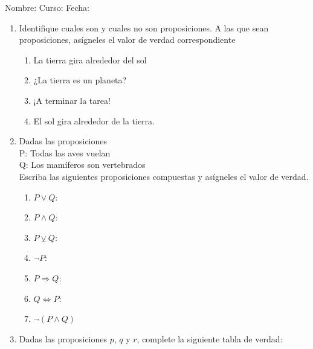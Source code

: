 \documentclass[letterpaper,fleqn]{article}
\newcommand{\LineaNombre}{%
\par
\vspace{\baselineskip}
Nombre:\hrulefill \; Curso: \underline{\hspace*{48pt}} \; Fecha: \underline{\hspace*{2.5cm}} \relax
\par}
\begin{document}
\LineaNombre
\begin{enumerate}
 \item Identifique cuales son y cuales no son proposiciones. A las que sean proposiciones, as\'{i}gneles el valor de verdad correspondiente
 \begin{enumerate}
 \item La tierra gira alrededor del sol
 \item ¿La tierra es un planeta?
 \item ¡A terminar la tarea!
 \item El sol gira alrededor de la tierra.
 \end{enumerate}
 \item Dadas las proposiciones\\
 P: Todas las aves vuelan\\
 Q: Los mamíferos son vertebrados\\
Escriba las siguientes proposiciones compuestas y asígneles el valor de verdad.
\begin{enumerate}
\item $P\vee Q$:
\item $P\wedge Q$:
\item $P \veebar Q$:
\item $\neg P$:
\item $P\Rightarrow Q$:
\item $Q\Leftrightarrow P$:
\item $\neg (P\wedge Q)$
\end{enumerate}
\item Dadas las proposiciones $p$, $q$ y $r$, complete la siguiente tabla de verdad:

 \end{enumerate}
\end{document}
